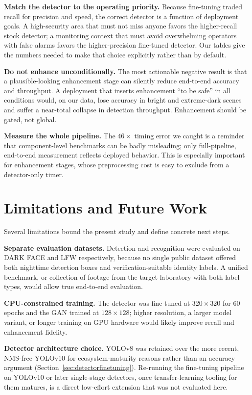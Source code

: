 \documentclass[conference]{IEEEtran}
\begin{document}
\textbf{Match the detector to the operating priority.} Because
fine-tuning traded recall for precision and speed, the correct
detector is a function of deployment goals. A high-security area
that must not miss anyone favors the higher-recall stock detector;
a monitoring context that must avoid overwhelming operators with
false alarms favors the higher-precision fine-tuned detector. Our
tables give the numbers needed to make that choice explicitly
rather than by default.

\textbf{Do not enhance unconditionally.} The most actionable
negative result is that a plausible-looking enhancement stage can
silently reduce end-to-end accuracy and throughput. A deployment
that inserts enhancement ``to be safe'' in all conditions would,
on our data, lose accuracy in bright and extreme-dark scenes and
suffer a near-total collapse in detection throughput. Enhancement
should be gated, not global.

\textbf{Measure the whole pipeline.} The $46\times$ timing error
we caught is a reminder that component-level benchmarks can be
badly misleading; only full-pipeline, end-to-end measurement
reflects deployed behavior. This is especially important for
enhancement stages, whose preprocessing cost is easy to exclude
from a detector-only timer.

\section{Limitations and Future Work}
\label{sec:limitations}
Several limitations bound the present study and define concrete
next steps.

\textbf{Separate evaluation datasets.}
\label{sec:separatedatasets}
Detection and recognition
were evaluated on DARK FACE and LFW respectively, because no
single public dataset offered both nighttime detection boxes and
verification-suitable identity labels. A unified benchmark, or
collection of footage from the target laboratory with both label
types, would allow true end-to-end evaluation.

\textbf{CPU-constrained training.} The detector was fine-tuned at
$320\times320$ for 60 epochs and the GAN trained at
$128\times128$; higher resolution, a larger model variant, or
longer training on GPU hardware would likely improve recall and
enhancement fidelity.

\textbf{Detector architecture choice.}
\label{sec:detectorchoice}
YOLOv8 was retained over the more recent, NMS-free YOLOv10
\cite{yolov10} for ecosystem-maturity reasons rather than an
accuracy argument (Section~\ref{sec:detectorfinetuning}). Re-running the fine-tuning
pipeline on YOLOv10 or later single-stage detectors, once
transfer-learning tooling for them matures, is a direct low-effort
extension that was not evaluated here.
\end{document}
